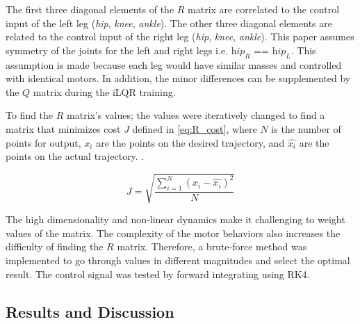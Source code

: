 The first three diagonal elements of the $R$ matrix are correlated to the control input of the left leg (\textit{hip}, \textit{knee}, \textit{ankle}). The other three diagonal elements are related to the control input of the right leg (\textit{hip}, \textit{knee}, \textit{ankle}). This paper assumes symmetry of the joints for the left and right legs i.e. $\textit{hip}_R$ == $\textit{hip}_L$.  This assumption is made because each leg would have similar masses and controlled with identical motors. In addition, the minor differences can be supplemented by the $Q$ matrix during the iLQR training.  

To find the $R$ matrix's values; the values were iteratively changed to find a matrix that minimizes cost $J$ defined in \autoref{eq:R_cost}, where $N$ is the number of points for output, $x_i$ are the points on the desired trajectory, and $\hat{x_i}$ are the points on the actual trajectory. 
 \cite{chai2014root}.

\begin{equation}
    J = \sqrt{\frac{\sum_{i=1}^N(x_i-\hat{x_i})^2}{N}}
    \label{eq:R_cost}
\end{equation}

The high dimensionality and non-linear dynamics make it challenging to weight values of the matrix\cite{park2012multi}. The complexity of the motor behaviors also increases the difficulty of finding the $R$ matrix. Therefore, a brute-force method was implemented to go through values in different magnitudes and select the optimal result. The control signal was tested by forward integrating using RK4.  




\subsection{Results and Discussion}



